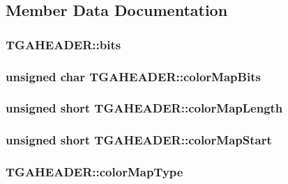 \subsection{Member Data Documentation}
\hypertarget{struct_t_g_a_h_e_a_d_e_r_a11419767ec86b64b07aef26f94818075}{
\subsubsection[{bits}]{ T\-G\-A\-H\-E\-A\-D\-E\-R\-::bits}}\label{struct_t_g_a_h_e_a_d_e_r_a11419767ec86b64b07aef26f94818075}
\hypertarget{struct_t_g_a_h_e_a_d_e_r_ac1ec5898c11a2c2a857135f6491476a8}{
\subsubsection[{color\-Map\-Bits}]{\setlength{\rightskip}{0pt plus 5cm}unsigned char T\-G\-A\-H\-E\-A\-D\-E\-R\-::color\-Map\-Bits}}\label{struct_t_g_a_h_e_a_d_e_r_ac1ec5898c11a2c2a857135f6491476a8}
\hypertarget{struct_t_g_a_h_e_a_d_e_r_a099159a965bb119e3f0bb6ab51263be2}{
\subsubsection[{color\-Map\-Length}]{\setlength{\rightskip}{0pt plus 5cm}unsigned short T\-G\-A\-H\-E\-A\-D\-E\-R\-::color\-Map\-Length}}\label{struct_t_g_a_h_e_a_d_e_r_a099159a965bb119e3f0bb6ab51263be2}
\hypertarget{struct_t_g_a_h_e_a_d_e_r_a77b4ee20178980a4c15b4f9964d316a5}{
\subsubsection[{color\-Map\-Start}]{\setlength{\rightskip}{0pt plus 5cm}unsigned short T\-G\-A\-H\-E\-A\-D\-E\-R\-::color\-Map\-Start}}\label{struct_t_g_a_h_e_a_d_e_r_a77b4ee20178980a4c15b4f9964d316a5}
\hypertarget{struct_t_g_a_h_e_a_d_e_r_afa9624515a431c35cac310dc616cce20}{
\subsubsection[{color\-Map\-Type}]{ T\-G\-A\-H\-E\-A\-D\-E\-R\-::color\-Map\-Type}}\label{struct_t_g_a_h_e_a_d_e_r_afa9624515a431c35cac310dc616cce20}
